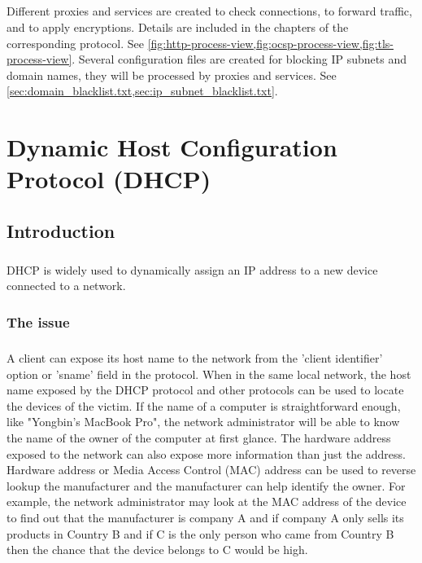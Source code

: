 \documentclass[mscthesis]{usiinfthesis}
\begin{document}
\paragraph{}
Different proxies and services are created to check connections, to forward traffic, and to apply encryptions. Details are included in the chapters of the corresponding protocol. See \cref{fig:http-process-view,fig:ocsp-process-view,fig:tls-process-view}. Several configuration files are created for blocking IP subnets and domain names, they will be processed by proxies and services. See \cref{sec:domain_blacklist.txt,sec:ip_subnet_blacklist.txt}.

\chapter{Dynamic Host Configuration Protocol (DHCP)}\label{cha:dhcp}

\section{Introduction}
\paragraph{}
DHCP is widely used to dynamically assign an IP address to a new device connected to a network.

\subsection{The issue}
\paragraph{}
A client can expose its host name to the network from the 'client identifier' option or 'sname' field in the protocol. When in the same local network, the host name exposed by the DHCP protocol and other protocols can be used to locate the devices of the victim. If the name of a computer is straightforward enough, like "Yongbin's MacBook Pro", the network administrator will be able to know the name of the owner of the computer at first glance. The hardware address exposed to the network can also expose more information than just the address. Hardware address or Media Access Control (MAC) address can be used to reverse lookup the manufacturer and the manufacturer can help identify the owner. For example, the network administrator may look at the MAC address of the device to find out that the manufacturer is company A and if company A only sells its products in Country B and if C is the only person who came from Country B then the chance that the device belongs to C would be high.
\end{document}
